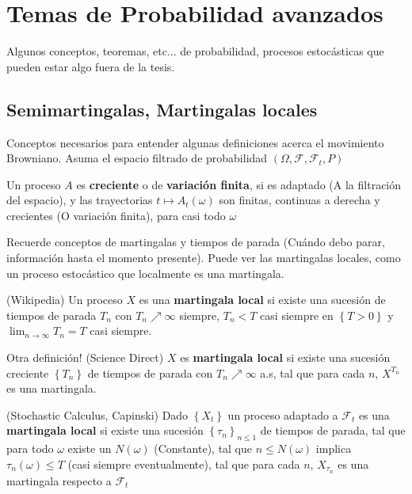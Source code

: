 \section{Temas de Probabilidad avanzados}

Algunos conceptos, teoremas, etc... de probabilidad, procesos estocásticas que pueden estar algo fuera de la tesis.

\subsection{Semimartingalas, Martingalas locales}

Conceptos necesarios para entender algunas definiciones acerca el movimiento Browniano. Asuma el espacio filtrado de probabilidad $(\Omega, \mathcal{F}, \mathcal{F}_t, P)$

\begin{boxDef}
	Un proceso $A$ es \textbf{creciente} o de \textbf{variación finita}, si es adaptado (A la filtración del espacio), y las trayectorias $t \mapsto A_t (\omega)$ son finitas, continuas a derecha y crecientes (O variación finita), para casi todo $\omega$
\end{boxDef} 


Recuerde conceptos de martingalas y tiempos de parada (Cuándo debo parar, información hasta el momento presente). Puede ver las martingalas locales, como un proceso estocástico que localmente es una martingala. 

\begin{boxDef}
	(Wikipedia) Un proceso $X$ es una \textbf{martingala local} si existe una sucesión de tiempos de parada $T_n$ con $T_n \nearrow \infty$ siempre, $T_n < T $ casi siempre en $\left\{ T > 0 \right\}$ y $\lim_{n \rightarrow \infty} T_n = T$ casi siempre.

	Otra definición! (Science Direct) $X$ es \textbf{martingala local} si existe una sucesión creciente $\left\{ T_n \right\}$ de tiempos de parada con $T_n \nearrow \infty$ a.s, tal que para cada $n$, $X^{T_n}$ es una martingala.

	(Stochastic Calculus, Capinski) Dado $\left\{ X_t \right\}$ un proceso adaptado a $\mathcal{F}_t$ es una \textbf{martingala local} si existe una sucesión $\left\{ \tau_n \right\}_{n \leq 1}$ de tiempos de parada, tal que para todo $\omega$ existe un $N(\omega)$ (Constante), tal que $n \leq N(\omega)$ implica $\tau_n (\omega) \leq T $ (casi siempre eventualmente), tal que para cada $n$, $X_{\tau_n}$ es una martingala respecto a $\mathcal{F}_t$
\end{boxDef}



